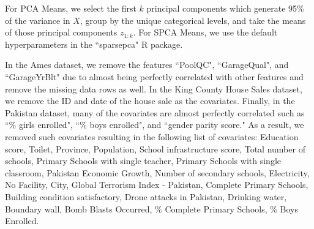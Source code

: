 \documentclass{article}
\theoremstyle{plain}
\theoremstyle{definition}
\theoremstyle{remark}
\begin{document}
For PCA Means, we select the first $k$ principal components which generate 95\% of the variance in $X$, group by the unique categorical levels, and take the means of those principal components $z_{1:k}$. For SPCA Means, we use the default hyperparameters in the ``sparsepca" R package. %

In the Ames dataset, we remove the features ``PoolQC", ``GarageQual", and ``GarageYrBlt" due to almost being perfectly correlated with other features and remove the missing data rows as well. In the King County House Sales dataset, we remove the ID and date of the house sale as the covariates. Finally, in the Pakistan dataset, many of the covariates are almost perfectly correlated such as ``\% girls enrolled", ``\% boys enrolled", and ``gender parity score." As a result, we removed such covariates resulting in the following list of covariates: Education score, Toilet, Province, Population, School infrastructure score, Total number of schools, Primary Schools with single teacher, Primary Schools with single classroom, Pakistan Economic Growth, Number of secondary schools, Electricity, No Facility, City, Global Terrorism Index - Pakistan, Complete Primary Schools, Building condition satisfactory, Drone attacks in Pakistan, Drinking water, Boundary wall, Bomb Blasts Occurred, \% Complete Primary Schools, \% Boys Enrolled.








\end{document}
